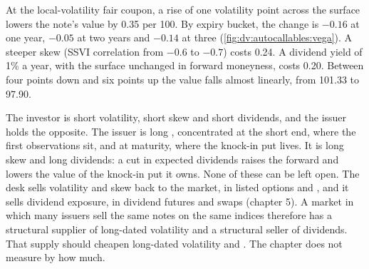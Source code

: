 \begin{example}\label{ex:dv:autocallables:greeks}
At the local-volatility fair coupon, a rise of one volatility point across the surface lowers the note's value by 0.35 per 100.
By expiry bucket, the change is $-0.16$ at one year, $-0.05$ at two years and $-0.14$ at three
(\cref{fig:dv:autocallables:vega}). A steeper skew (SSVI correlation from $-0.6$ to $-0.7$) costs 0.24. A dividend yield of 1\% a
year, with the surface unchanged in forward moneyness, costs 0.20. Between four points down and six points up the value
falls almost linearly, from 101.33 to 97.90.
\end{example}

The investor is short volatility, short skew and short dividends, and the issuer holds the opposite. The issuer is long ,
concentrated at the short end, where the first observations sit, and at maturity, where the knock-in put lives. It is long
skew and long dividends: a cut in expected dividends raises the forward and lowers the value of the knock-in put it owns. None
of these can be left open. The desk sells volatility and skew back to the market, in listed options and , and it
sells dividend exposure, in dividend futures and swaps (chapter 5). A market in which many issuers sell the same notes on the
same indices therefore has a structural supplier of long-dated volatility and a structural seller of dividends. That supply should
cheapen long-dated volatility and . The chapter does not measure by how much.

